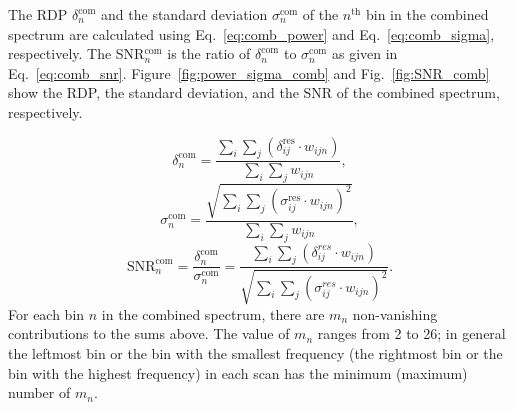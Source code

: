 The RDP $\delta^\text{com}_{n}$ and the standard deviation 
$\sigma^\text{com}_{n}$ of the $n^\text{th}$ bin in the combined spectrum are 
calculated using Eq.~\eqref{eq:comb_power} and Eq.~\eqref{eq:comb_sigma}, 
respectively. The SNR$^\text{com}_{n}$ is the ratio of 
$\delta^\text{com}_{n}$ to 
$\sigma^\text{com}_{n}$ as given in Eq.~\eqref{eq:comb_snr}. 
Figure~\ref{fig:power_sigma_comb} and Fig.~\ref{fig:SNR_comb} show the RDP, 
the standard deviation, and the SNR of the combined spectrum, respectively.

\begin{equation}
    \label{eq:comb_power}
    \delta_{n}^\text{com} = \frac{ \sum\limits_{i}\sum\limits_{j}\left(\delta_{ij}^\text{res} \cdot {w_{ijn}}\right)}{\sum\limits_{i}\sum\limits_{j} {w_{ijn}}},
\end{equation}
\begin{equation}
    \label{eq:comb_sigma}
    \sigma_{n}^\text{com} = \frac{ \sqrt{\sum\limits_{i}\sum\limits_{j}(\sigma_{ij}^\text{res} \cdot {w_{ijn}})^2}}{\sum\limits_{i}\sum\limits_{j} {w_{ijn}}},
\end{equation}
\begin{equation}
    \label{eq:comb_snr}
    \text{SNR}_{n}^\text{com} = \frac{\delta^\text{com}_{n}}{\sigma^\text{com}_{n}}= \frac{\sum\limits_{i}\sum\limits_{j}\left(\delta_{ij}^{res} \cdot {w_{ijn}}\right)}{ \sqrt{\sum\limits_{i}\sum\limits_{j}(\sigma_{ij}^{res} \cdot {w_{ijn}})^2}}.
\end{equation} 
For each bin $n$ in the combined spectrum, there are $m_n$ non-vanishing 
contributions to the sums above. The value of $m_n$ ranges from 2 to 26; 
in general the leftmost bin or the bin with the smallest frequency 
(the rightmost bin or the bin with the highest frequency) in each scan has 
the minimum (maximum) number of $m_n$. 


